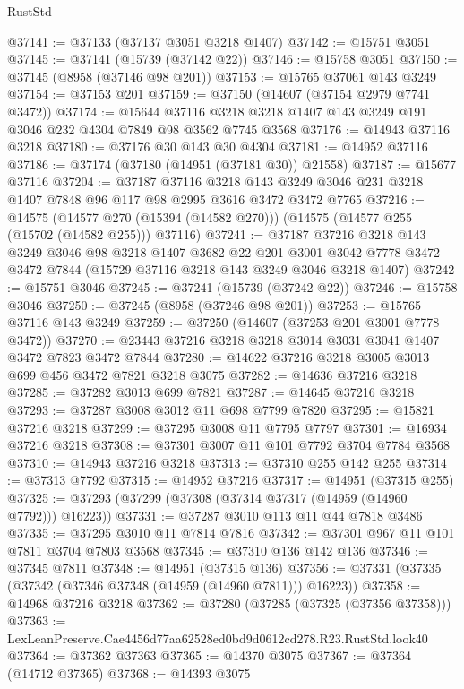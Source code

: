 \begin{lexlean}{RustStd}
\begin{coremodule}
@37141 := @37133 (@37137 @3051 @3218 @1407)
@37142 := @15751 @3051
@37145 := @37141 (@15739 (@37142 @22))
@37146 := @15758 @3051
@37150 := @37145 (@8958 (@37146 @98 @201))
@37153 := @15765 @37061 @143 @3249
@37154 := @37153 @201
@37159 := @37150 (@14607 (@37154 @2979 @7741 @3472))
@37174 := @15644
    @37116
    @3218
    @3218
    @1407
    @143
    @3249
    @191
    @3046
    @232
    @4304
    @7849
    @98
    @3562
    @7745
    @3568
@37176 := @14943 @37116 @3218
@37180 := @37176 @30 @143 @30 @4304
@37181 := @14952 @37116
@37186 := @37174 (@37180 (@14951 (@37181 @30)) @21558)
@37187 := @15677 @37116
@37204 := @37187
    @37116
    @3218
    @143
    @3249
    @3046
    @231
    @3218
    @1407
    @7848
    @96
    @117
    @98
    @2995
    @3616
    @3472
    @3472
    @7765
@37216 := @14575
    (@14577 @270 (@15394 (@14582 @270)))
    (@14575 (@14577 @255 (@15702 (@14582 @255))) @37116)
@37241 := @37187
    @37216
    @3218
    @143
    @3249
    @3046
    @98
    @3218
    @1407
    @3682
    @22
    @201
    @3001
    @3042
    @7778
    @3472
    @3472
    @7844
    (@15729 @37116 @3218 @143 @3249 @3046 @3218 @1407)
@37242 := @15751 @3046
@37245 := @37241 (@15739 (@37242 @22))
@37246 := @15758 @3046
@37250 := @37245 (@8958 (@37246 @98 @201))
@37253 := @15765 @37116 @143 @3249
@37259 := @37250 (@14607 (@37253 @201 @3001 @7778 @3472))
@37270 := @23443 @37216 @3218 @3218 @3014 @3031 @3041 @1407 @3472 @7823 @3472 @7844
@37280 := @14622 @37216 @3218 @3005 @3013 @699 @456 @3472 @7821 @3218 @3075
@37282 := @14636 @37216 @3218
@37285 := @37282 @3013 @699 @7821
@37287 := @14645 @37216 @3218
@37293 := @37287 @3008 @3012 @11 @698 @7799 @7820
@37295 := @15821 @37216 @3218
@37299 := @37295 @3008 @11 @7795 @7797
@37301 := @16934 @37216 @3218
@37308 := @37301 @3007 @11 @101 @7792 @3704 @7784 @3568
@37310 := @14943 @37216 @3218
@37313 := @37310 @255 @142 @255
@37314 := @37313 @7792
@37315 := @14952 @37216
@37317 := @14951 (@37315 @255)
@37325 := @37293 (@37299 (@37308 (@37314 @37317 (@14959 (@14960 @7792))) @16223))
@37331 := @37287 @3010 @113 @11 @44 @7818 @3486
@37335 := @37295 @3010 @11 @7814 @7816
@37342 := @37301 @967 @11 @101 @7811 @3704 @7803 @3568
@37345 := @37310 @136 @142 @136
@37346 := @37345 @7811
@37348 := @14951 (@37315 @136)
@37356 := @37331 (@37335 (@37342 (@37346 @37348 (@14959 (@14960 @7811))) @16223))
@37358 := @14968 @37216 @3218
@37362 := @37280 (@37285 (@37325 (@37356 @37358)))
@37363 := LexLeanPreserve.Cae4456d77aa62528ed0bd9d0612cd278.R23.RustStd.look40
@37364 := @37362 @37363
@37365 := @14370 @3075
@37367 := @37364 (@14712 @37365)
@37368 := @14393 @3075

\end{coremodule}
\end{lexlean}
